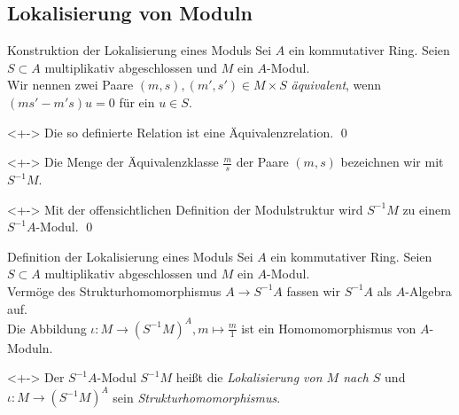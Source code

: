 \subsection{Lokalisierung von Moduln}

\begin{frame}{Konstruktion der Lokalisierung eines Moduls}
	Sei \(A\) ein kommutativer Ring. Seien \(S \subset A\) multiplikativ abgeschlossen und
	\(M\) ein \(A\)-Modul.
	\\
	Wir nennen zwei Paare \((m, s), (m', s') \in M \times S\) \emph{äquivalent}, wenn \((ms' - m's) u = 0\) für
	ein \(u \in S\).
	\begin{proposition}<+->
		Die so definierte Relation ist eine Äquivalenzrelation.
		\qed
	\end{proposition}
	\begin{visibleenv}<+->
		Die Menge der Äquivalenzklasse \(\frac m s\) der Paare \((m, s)\) bezeichnen wir mit \(S^{-1} M\). 
	\end{visibleenv}
	\begin{proposition}<+->
		Mit der offensichtlichen Definition der Modulstruktur wird \(S^{-1} M\) zu einem \(S^{-1} A\)-Modul.
		\qed
	\end{proposition}
\end{frame}

\begin{frame}{Definition der Lokalisierung eines Moduls}
	Sei \(A\) ein kommutativer Ring. Seien \(S \subset A\) multiplikativ abgeschlossen und
	\(M\) ein \(A\)-Modul.
	\\
	Vermöge des Strukturhomomorphismus \(A \to S^{-1} A\) fassen wir \(S^{-1} A\) als \(A\)-Algebra auf.
	\\
	Die Abbildung \(\iota\colon M \to (S^{-1} M)^A, m \mapsto \frac m 1\)
	ist ein Homomomorphismus von \(A\)-Moduln.
	\begin{definition}<+->
		Der \(S^{-1} A\)-Modul \(S^{-1} M\) heißt die \emph{Lokalisierung von \(M\) nach \(S\)} und
		\(\iota\colon M \to (S^{-1} M)^A\) sein \emph{Strukturhomomorphismus}.
	\end{definition}
\end{frame}

